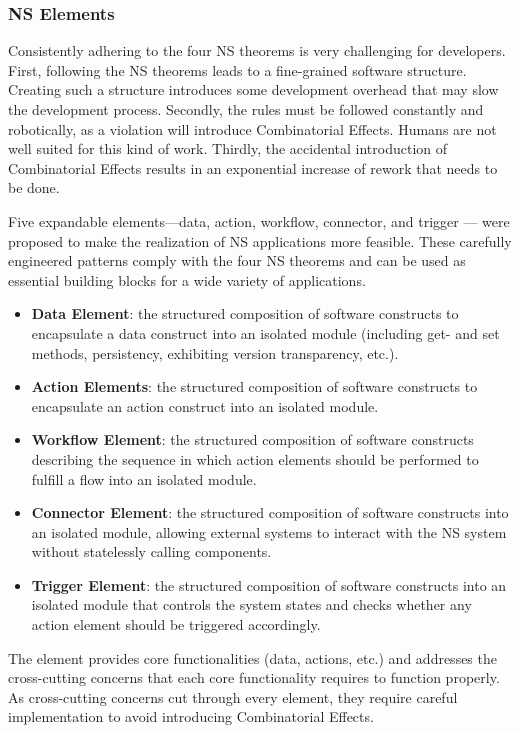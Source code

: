 \subsubsection{NS Elements}\label{NS Elements} Consistently adhering to the four NS
theorems is very challenging for developers. First, following the NS theorems leads to a
fine-grained software structure. Creating such a structure introduces some development
overhead that may slow the development process. Secondly, the rules must be followed
constantly and robotically, as a violation will introduce Combinatorial Effects. Humans
are not well suited for this kind of work. Thirdly, the accidental introduction of
Combinatorial Effects results in an exponential increase of rework that needs to be done.

Five expandable elements—data, action, workflow, connector, and trigger — were proposed to
make the realization of NS applications more feasible. These carefully engineered patterns
comply with the four NS theorems and can be used as essential building blocks for a wide
variety of applications.

\begin{itemize}
    \item \textbf{Data Element}: the structured composition of software constructs to
    encapsulate a data construct into an isolated module (including get- and set methods,
    persistency, exhibiting version transparency, etc.).
    \item \textbf{Action Elements}: the structured composition of software constructs to
    encapsulate an action construct into an isolated module.
    \item \textbf{Workflow Element}: the structured composition of software constructs describing the sequence in which action elements should be performed to fulfill a flow into an isolated module.
    \item \textbf{Connector Element}: the structured composition of software constructs into an isolated module, allowing external systems to interact with the NS system without statelessly calling components.
    \item \textbf{Trigger Element}: the structured composition of software constructs into an isolated module that controls the system states and checks whether any action element should be triggered accordingly.
\end{itemize}

The element provides core functionalities (data, actions, etc.) and addresses the
cross-cutting concerns that each core functionality requires to function properly. As
cross-cutting concerns cut through every element, they require careful implementation to
avoid introducing Combinatorial Effects.
%
%
